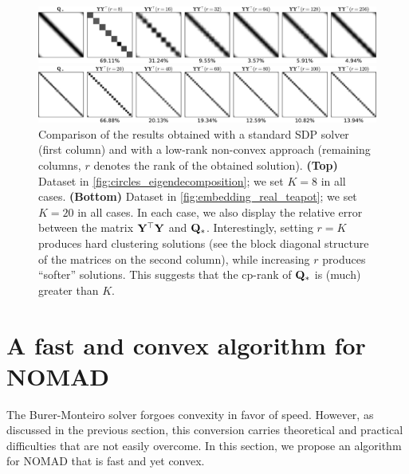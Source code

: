 \documentclass[twoside,11pt]{article}
\begin{document}
\begin{figure}
	\centering
	\includegraphics[width=.85\linewidth]{reconstruction/circles_burer-monteiro}

	\includegraphics[width=.85\linewidth]{reconstruction/teapot_burer-monteiro}

	\caption{Comparison of the results obtained with a standard SDP solver (first column) and with a low-rank non-convex approach (remaining columns, $r$ denotes the rank of the obtained solution). \textbf{(Top)} Dataset in \cref{fig:circles_eigendecomposition}; we set $K=8$ in all cases. \textbf{(Bottom)} Dataset in \cref{fig:embedding_real_teapot}; we set $K=20$ in all cases. In each case, we also display the relative error between the matrix ${{\mathbf{Y}}}^\top {\mathbf{Y}}$ and ${\mathbf{Q}}_*$. Interestingly, setting $r=K$ produces hard clustering solutions (see the block diagonal structure of the matrices on the second column), while increasing $r$ produces ``softer'' solutions. This suggests that the cp-rank of ${\mathbf{Q}}_*$ is (much) greater than $K$.}
	\label{fig:completely_positive_burer-monteiro}
\end{figure}

\section{A fast and convex algorithm for NOMAD}

The Burer-Monteiro solver forgoes convexity in favor of speed. However, as discussed in the previous section, this conversion carries theoretical and practical difficulties that are not easily overcome.
In this section, we propose an algorithm for NOMAD that is fast and yet convex.
\end{document}

